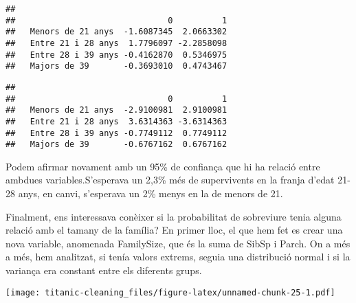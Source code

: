 \documentclass[]{article}
\newenvironment{Shaded}{\begin{snugshade}}{\end{snugshade}}
\newcommand{\CommentTok}[1]{\textcolor[rgb]{0.56,0.35,0.01}{\textit{#1}}}
\newcommand{\DataTypeTok}[1]{\textcolor[rgb]{0.13,0.29,0.53}{#1}}
\newcommand{\DecValTok}[1]{\textcolor[rgb]{0.00,0.00,0.81}{#1}}
\newcommand{\KeywordTok}[1]{\textcolor[rgb]{0.13,0.29,0.53}{\textbf{#1}}}
\newcommand{\NormalTok}[1]{#1}
\newcommand{\OperatorTok}[1]{\textcolor[rgb]{0.81,0.36,0.00}{\textbf{#1}}}
\newcommand{\StringTok}[1]{\textcolor[rgb]{0.31,0.60,0.02}{#1}}
\begin{document}
\begin{verbatim}
##                     
##                               0          1
##   Menors de 21 anys  -1.6087345  2.0663302
##   Entre 21 i 28 anys  1.7796097 -2.2858098
##   Entre 28 i 39 anys -0.4162870  0.5346975
##   Majors de 39       -0.3693010  0.4743467
\end{verbatim}

\begin{Shaded}
\end{Shaded}

\begin{verbatim}
##                     
##                               0          1
##   Menors de 21 anys  -2.9100981  2.9100981
##   Entre 21 i 28 anys  3.6314363 -3.6314363
##   Entre 28 i 39 anys -0.7749112  0.7749112
##   Majors de 39       -0.6767162  0.6767162
\end{verbatim}

Podem afirmar novament amb un 95\% de confiança que hi ha relació entre
ambdues variables.S'esperava un 2,3\% més de supervivents en la franja
d'edat 21-28 anys, en canvi, s'esperava un 2\% menys en la de menors de
21.

Finalment, ens interessava conèixer si la probabilitat de sobreviure
tenia alguna relació amb el tamany de la família? En primer lloc, el que
hem fet es crear una nova variable, anomenada FamilySize, que és la suma
de SibSp i Parch. On a més a més, hem analitzat, si tenía valors
extrems, seguia una distribució normal i si la variança era constant
entre els diferents grups.

\begin{Shaded}
\end{Shaded}

\texttt{[image: titanic-cleaning\_files/figure-latex/unnamed-chunk-25-1.pdf]}
\end{document}
